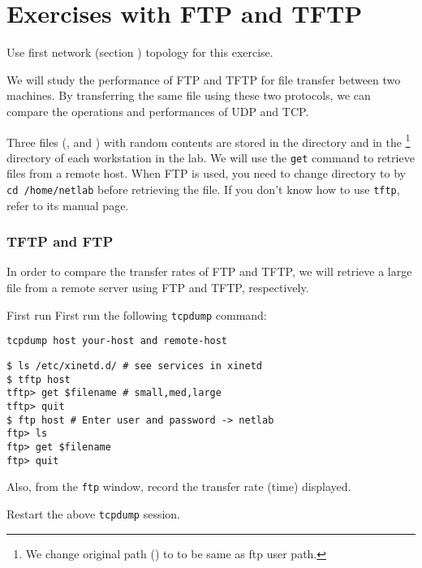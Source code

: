 \documentclass{../UTNetLab}
\begin{document}
\part{Exercises with FTP and TFTP}
    Use first network (section ) topology for this exercise.

    We will study the performance of FTP and TFTP for file transfer between two machines.
    By transferring the same file using these two protocols, we can compare the operations and performances of UDP and TCP. 

    Three files (,  and ) with random contents are stored in the  directory and in the \footnote{We change original path () to  to be same as ftp user path.} directory of each workstation in the lab.
    We will use the \lstinline{get} command to retrieve files from a remote host.
    When FTP is used, you need to change directory to  by \lstinline{cd /home/netlab} before retrieving the file.
    If you don’t know how to use \lstinline{tftp}, refer to its manual page.


\section{TFTP and FTP}
    In order to compare the transfer rates of FTP and TFTP, we will retrieve a large file from a remote server using FTP and TFTP, respectively.

    First run First run the following \lstinline{tcpdump} command:
    \begin{lstlisting}[emph={your-host,remote-host}]
tcpdump host your-host and remote-host
    \end{lstlisting}
    \begin{lstlisting}[emph={host}]
$ ls /etc/xinetd.d/ # see services in xinetd
$ tftp host
tftp> get $filename # small,med,large
tftp> quit
$ ftp host # Enter user and password -> netlab
ftp> ls
ftp> get $filename
ftp> quit
    \end{lstlisting}

    Also, from the \lstinline{ftp} window, record the transfer rate (time) displayed. 

    Restart the above \lstinline{tcpdump} session.
\end{document}
